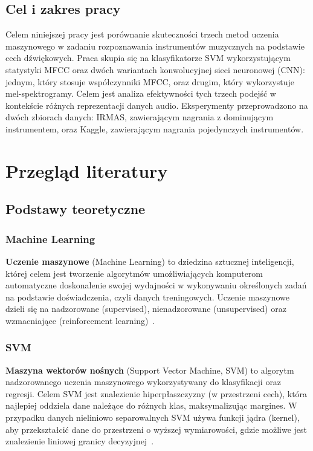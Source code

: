\documentclass{SGGW-thesis}
\begin{document}
\section{Cel i zakres pracy}
Celem niniejszej pracy jest porównanie skuteczności trzech metod uczenia maszynowego w zadaniu rozpoznawania instrumentów muzycznych na podstawie cech dźwiękowych. Praca skupia się na klasyfikatorze SVM wykorzystującym statystyki MFCC oraz dwóch wariantach konwolucyjnej sieci neuronowej (CNN): jednym, który stosuje współczynniki MFCC, oraz drugim, który wykorzystuje mel-spektrogramy. Celem jest analiza efektywności tych trzech podejść w kontekście różnych reprezentacji danych audio. Eksperymenty przeprowadzono na dwóch zbiorach danych: IRMAS, zawierającym nagrania z dominującym instrumentem, oraz Kaggle, zawierającym nagrania pojedynczych instrumentów.




\chapter{Przegląd literatury}

\section{Podstawy teoretyczne}

\subsection{Machine Learning}
\textbf{Uczenie maszynowe} (Machine Learning) to dziedzina sztucznej inteligencji, której celem jest tworzenie algorytmów umożliwiających komputerom automatyczne doskonalenie swojej wydajności w wykonywaniu określonych zadań na podstawie doświadczenia, czyli danych treningowych. Uczenie maszynowe dzieli się na nadzorowane (supervised), nienadzorowane (unsupervised) oraz wzmacniające (reinforcement learning)~\cite{mitchell1997machine}.

\subsection{SVM}
\textbf{Maszyna wektorów nośnych} (Support Vector Machine, SVM) to algorytm nadzorowanego uczenia maszynowego wykorzystywany do klasyfikacji oraz regresji. Celem SVM jest znalezienie hiperpłaszczyzny (w przestrzeni cech), która najlepiej oddziela dane należące do różnych klas, maksymalizując margines. W przypadku danych nieliniowo separowalnych SVM używa funkcji jądra (kernel), aby przekształcić dane do przestrzeni o wyższej wymiarowości, gdzie możliwe jest znalezienie liniowej granicy decyzyjnej~\cite{moguerza2006support}. 
\end{document}
